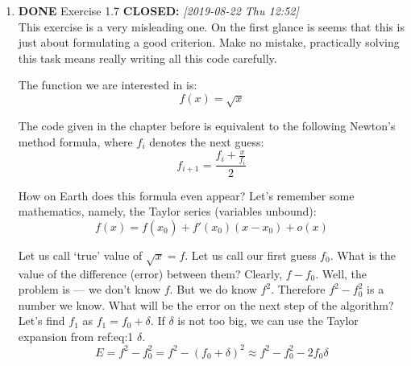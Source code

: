 \documentclass[11pt]{article}
\begin{document}
\begin{enumerate}
\begin{enumerate}
However, this issue can be solved using scheme macros.

\lstset{language=Lisp,label= ,caption= ,captionpos=b,numbers=none}
\begin{lstlisting}
(import (chibi ast))
(import (chibi show))
 (define (disp sexp)
   (display sexp)
   (newline))
(define-syntax new-if
  (syntax-rules ()
    ( (new-if predicate then-clause else-clause)
      (cond (predicate then-clause)
            (else else-clause))
    )
  )
)
(define a 1)
(define b 0)
(disp (if (not (= b 0)) (/ a b) a))
(disp (new-if (not (= b 0)) (/ a b) a))

\end{lstlisting}

The code above works as expected, because the macro does not evaluate
its arguments, and (cond) is a special form.

\item {\bfseries\sffamily DONE} Exercise 1.7
\label{sec:org35996d1}
\noindent\textbf{CLOSED:} \textit{[2019-08-22 Thu 12:52]}\\
This exercise is a very misleading one. On the first glance is seems
that this is just about formulating a good criterion. Make no mistake,
practically solving this task means really writing all this code
carefully.

The function we are interested in is:
\begin{equation}
\label{eq:5}
f(x) = \sqrt{x}
\end{equation}

The code given in the chapter before is equivalent to the following
Newton's method formula, where \(f_i\) denotes the next guess:
\begin{equation}
\label{eq:1} 
f_{i+1}_{} = \frac{f_i + \frac{x}{f_i}}{2}
\end{equation}

How on Earth does this formula even appear? Let's remember some
mathematics, namely, the Taylor series (variables unbound):
\begin{equation}
\label{eq:2}
 f(x) = f(x_{0}_{}) + f'(x_{0})(x-x_{0}) + o(x)
\end{equation}

Let us call `true' value of \(\sqrt{x}=f\). Let us call our first guess
\(f_{0}\). What is the value of the difference (error) between them?
Clearly, \(f-f_0\). Well, the problem is — we don't know \(f\). But we do
know \(f^2\). Therefore \(f^2-f^2_0\) is a number we know. What will be the
error on the next step of the algorithm? Let's find \(f_1\) as
\(f_1=f_0+\delta\). If \(\delta\) is not too big, we can use the Taylor
expansion from ref:eq:1 \(\delta\).
\begin{equation}
\label{eq:8}
E = f^2 - f_0^2 = f^2 - (f_0 + \delta)^2 \approx f^2 - f_0^2 - 2f_0\delta
\end{equation}



\end{enumerate}
\end{enumerate}
\end{document}
